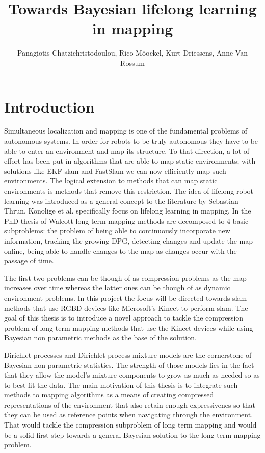 \documentclass[]{article}
\title{\vspace{-2.0cm}Towards Bayesian lifelong learning in mapping}
\author{Panagiotis Chatzichristodoulou, Rico  M\"{o}ockel, Kurt Driessens, Anne Van Rossum}
\affil{University of Maastricht, DoBots B.V.}
\date{}
\begin{document}
\maketitle %


\section{Introduction}

Simultaneous localization and mapping is one of the fundamental problems of autonomous systems\cite{probRobs}. In order for robots to be truly autonomous they have to be able to enter an environment and map its structure. To that direction, a lot of effort has been put in algorithms that are able to map static environments; with solutions like EKF-slam\cite{ekf} and FastSlam\cite{slam} we can now efficiently map such environments. 
The logical extension to methods that can map static environments is methods that remove this restriction. The idea of lifelong robot learning was introduced as a general concept to the literature by Sebastian Thrun\cite{liflonglearning}. Konolige et al.\cite{lifelongmaps} specifically focus on lifelong learning in mapping. In the PhD thesis of Walcott\cite{aishalong} long term mapping methods are decomposed to 4 basic subproblems: the problem of being able to continuously incorporate new information, tracking the growing DPG, detecting changes and update the map online, being able to handle changes to the map as changes occur with the passage of time.

The first two problems can be though of as compression problems as the map increases over time whereas the latter ones can be though of as dynamic environment problems. In this project the focus will be directed towards slam methods that use RGBD devices like Microsoft's Kinect to perform slam. The goal of this thesis is to introduce a novel approach to tackle the compression problem of long term mapping methods that use the Kinect devices while using Bayesian non parametric methods as the base of the solution.

Dirichlet processes and Dirichlet process mixture models\cite{nonParam} are the cornerstone of Bayesian non parametric statistics. The strength of those models lies in the fact that they allow the model's mixture components to grow as much as needed so as to best fit the data. The main motivation of this thesis is to integrate such methods to mapping algorithms as a means of creating compressed representations of the environment that also retain enough expressivenes so that they can be used as reference points when navigating through the environment. That would tackle the compression subproblem of long term mapping and would be a solid first step towards a general Bayesian solution to the long term mapping problem.
\end{document}
